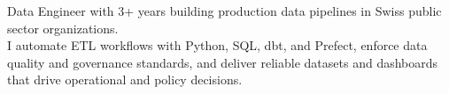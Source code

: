 
\begin{cvparagraph}
\sloppy
Data Engineer with 3+ years building production data pipelines in Swiss public sector organizations.\\
I automate ETL workflows with Python, SQL, dbt, and Prefect, enforce data quality and governance standards, and deliver reliable datasets and dashboards that drive operational and policy decisions.
\end{cvparagraph}

